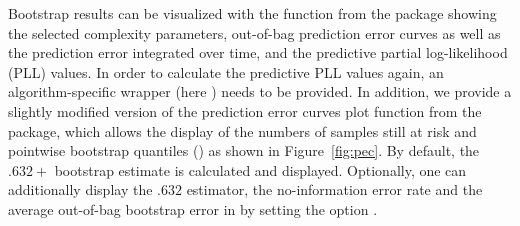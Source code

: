 \documentclass[nojss]{jss}
\begin{document}
\begin{Schunk}
\end{Schunk}

Bootstrap results can be visualized with the  function from the  package showing the selected complexity parameters, 
out-of-bag prediction error curves as well as the prediction error integrated over time, and the predictive partial log-likelihood (PLL) values. In order to calculate the predictive PLL values again, an algorithm-specific wrapper (here ) needs to be provided. In addition, we provide a slightly modified version of the prediction error curves plot function from the  package, which allows the display of the numbers of samples still at risk and pointwise bootstrap quantiles () as shown in Figure~\ref{fig:pec}. By default, the $.632+$ bootstrap estimate is calculated and displayed. Optionally, one can additionally display the $.632$ estimator, the no-information error rate and the average out-of-bag bootstrap error in  by setting the option . \\
\end{document}
